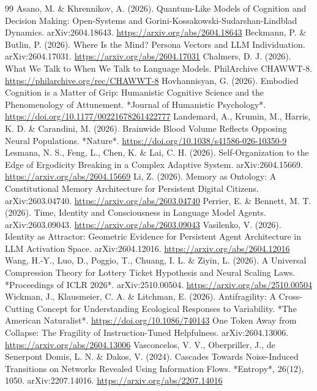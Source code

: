 \documentclass[11pt]{article}
\begin{document}
\begin{thebibliography}{99}
 Asano, M. \& Khrennikov, A. (2026). Quantum-Like Models of Cognition and Decision Making: Open-Systems and Gorini-Kossakowski-Sudarshan-Lindblad Dynamics. arXiv:2604.18643. \url{https://arxiv.org/abs/2604.18643}
 Beckmann, P. \& Butlin, P. (2026). Where Is the Mind? Persona Vectors and LLM Individuation. arXiv:2604.17031. \url{https://arxiv.org/abs/2604.17031}
 Chalmers, D. J. (2026). What We Talk to When We Talk to Language Models. PhilArchive CHAWWT-8. \url{https://philarchive.org/rec/CHAWWT-8}
 Hovhannisyan, G. (2026). Embodied Cognition is a Matter of Grip: Humanistic Cognitive Science and the Phenomenology of Attunement. *Journal of Humanistic Psychology*. \url{https://doi.org/10.1177/00221678261422777}
 Landemard, A., Krumin, M., Harris, K. D. \& Carandini, M. (2026). Brainwide Blood Volume Reflects Opposing Neural Populations. *Nature*. \url{https://doi.org/10.1038/s41586-026-10350-9}
 Lesmana, N. S., Feng, L., Chen, K. \& Lai, C. H. (2026). Self-Organization to the Edge of Ergodicity Breaking in a Complex Adaptive System. arXiv:2604.15669. \url{https://arxiv.org/abs/2604.15669}
 Li, Z. (2026). Memory as Ontology: A Constitutional Memory Architecture for Persistent Digital Citizens. arXiv:2603.04740. \url{https://arxiv.org/abs/2603.04740}
 Perrier, E. \& Bennett, M. T. (2026). Time, Identity and Consciousness in Language Model Agents. arXiv:2603.09043. \url{https://arxiv.org/abs/2603.09043}
 Vasilenko, V. (2026). Identity as Attractor: Geometric Evidence for Persistent Agent Architecture in LLM Activation Space. arXiv:2604.12016. \url{https://arxiv.org/abs/2604.12016}
 Wang, H.-Y., Luo, D., Poggio, T., Chuang, I. L. \& Ziyin, L. (2026). A Universal Compression Theory for Lottery Ticket Hypothesis and Neural Scaling Laws. *Proceedings of ICLR 2026*. arXiv:2510.00504. \url{https://arxiv.org/abs/2510.00504}
 Wickman, J., Klausmeier, C. A. \& Litchman, E. (2026). Antifragility: A Cross-Cutting Concept for Understanding Ecological Responses to Variability. *The American Naturalist*. \url{https://doi.org/10.1086/740143}
 One Token Away from Collapse: The Fragility of Instruction-Tuned Helpfulness. arXiv:2604.13006. \url{https://arxiv.org/abs/2604.13006}
 Vasconcelos, V. V., Oberpriller, J., de Senerpont Domis, L. N. \& Dakos, V. (2024). Cascades Towards Noise-Induced Transitions on Networks Revealed Using Information Flows. *Entropy*, 26(12), 1050. arXiv:2207.14016. \url{https://arxiv.org/abs/2207.14016}

\end{thebibliography}
\end{document}
